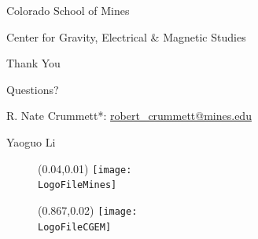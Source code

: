 \documentclass[dark]{cgem-presentation}
\makeatletter
\newcommand{\PresentationFirstAuthor}{R. Nate Crummett}
\newcommand{\PresentationFirstAuthorEmail}{\href{robert\_crummett@mines.edu}{robert\_crummett@mines.edu}}
\newcommand{\PresentationSecondAuthor}{Yaoguo Li}
\newcommand{\PresentationAffiliationCGEM}{Center for Gravity, Electrical \& Magnetic Studies}
\newcommand{\PresentationAffiliationMines}{Colorado School of Mines}
\makeatother
\begin{document}
  \begin{frame}[plain]
    \begin{center}
      { \color{SecondColor}
        \vspace{1mm}
        \small
        \PresentationAffiliationMines{}
        \par
        \vspace{1mm}
        \Large
        \PresentationAffiliationCGEM{}
        \par
      }
      \vspace{-1mm}
      \par
      \vspace{1.5cm}
      \LARGE
      Thank You

      Questions?
      \par
      \vspace{1.95cm}
      \par
      \vspace{-8mm}
      { \color{SecondColor}
        \normalsize
        \PresentationFirstAuthor{}*: %
          \PresentationFirstAuthorEmail{}
        \par
        \PresentationSecondAuthor{}
        \par
      }
    \end{center}

    \begin{figure}
      \begin{textblock*}{1.5cm}(0.04\paperwidth,0.01\paperheight)
        \texttt{[image: \\LogoFileMines]}
      \end{textblock*}
    \end{figure}

    \begin{figure}
      \vspace*{-19.00015pt}
      \begin{textblock*}{1.35cm}(0.867\paperwidth,0.02\paperheight)
        \texttt{[image: \\LogoFileCGEM]}
      \end{textblock*}
    \end{figure}

  \end{frame}

  \BibliographyFrame
  
\end{document}
